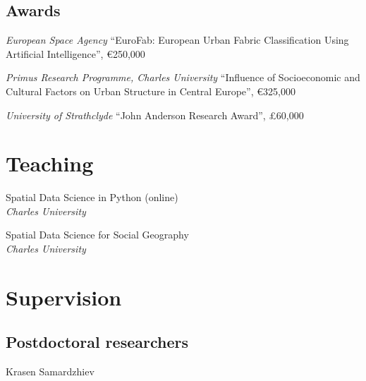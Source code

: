 \documentclass[12pt,a4paper]{report}
\begin{document}
    \subsection*{Awards}

    \begin{tablist}

        \item[2024] \tab{}\textit{European Space Agency} \enquote{EuroFab: European Urban Fabric Classification Using Artificial Intelligence}, €250,000
        \item[2023] \tab{}\textit{Primus Research Programme, Charles University} \enquote{Influence of Socioeconomic and Cultural Factors on Urban Structure in Central Europe}, €325,000
        \item[2018] \tab{}\textit{University of Strathclyde} \enquote{John Anderson Research Award}, £60,000

    \end{tablist}

    \section*{Teaching}

    \begin{tablist}

        \item[2024--] \tab{}Spatial Data Science in Python (online) \\
                            \textit{Charles University}
        \item[2023--] \tab{}Spatial Data Science for Social Geography \\
                            \textit{Charles University}

    \end{tablist}

    \section*{Supervision}

    \subsection*{Postdoctoral researchers}

    \begin{tablist}

        \item[2024--] \tab{}Krasen Samardzhiev

    \end{tablist}
\end{document}
